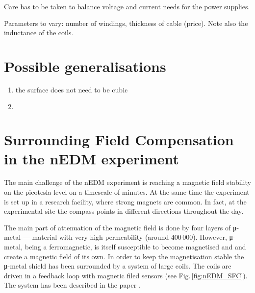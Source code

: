 Care has to be taken to balance voltage and current needs for the power supplies.

Parameters to vary: number of windings, thickness of cable (price). Note also
the inductance of the coils.

\section{Possible generalisations}
\begin{enumerate}
  \item the surface does not need to be cubic
  \item
\end{enumerate}



\section{Surrounding Field Compensation in the nEDM experiment}
The main challenge of the nEDM experiment is reaching a magnetic field stability on the picotesla level on a timescale of minutes. At the same time the experiment is set up in a research facility, where strong magnets are common. In fact, at the experimental site the compass points in different directions throughout the day.

The main part of attenuation of the magnetic field is done by four layers of \mbox{μ-metal} --- material with very high permeability (around 400\,000). However, \mbox{μ-metal}, being a ferromagnetic, is itself susceptible to become magnetised and and create a magnetic field of its own. In order to keep the magnetisation stable the \mbox{μ-metal} shield has been surrounded by a system of large coils. The coils are driven in a feedback loop with magnetic filed sensors (see Fig.\,\ref{fig:nEDM_SFC}). The system has been described in the paper \citep{Afach2014}.

